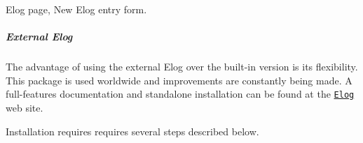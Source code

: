 \par
\par
\par
 \begin{center}  Elog page, New Elog entry form. \par
\par
\par
  \end{center}  \par
\par
\par




 \label{RC_mhttpd_Elog_page_idx_Elog_external}
\hypertarget{RC_mhttpd_Elog_page_idx_Elog_external}{}
 \hypertarget{RC_mhttpd_Elog_page_RC_mhttpd_External_Elog}{}\subparagraph{External Elog}\label{RC_mhttpd_Elog_page_RC_mhttpd_External_Elog}
The advantage of using the external Elog over the built-\/in version is its flexibility. This package is used worldwide and improvements are constantly being made. A full-\/features documentation and standalone installation can be found at the \href{http://midas.psi.ch/elog/}{\tt Elog} web site.

Installation requires requires several steps described below.


